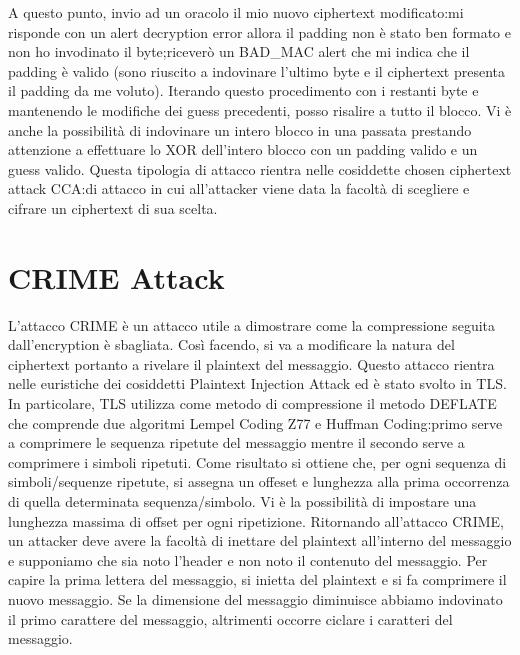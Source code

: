 \documentclass[a4paper,draft]{article}
\begin{document}
A questo punto, invio ad un oracolo il mio nuovo ciphertext modificato:\@se mi risponde con un alert decryption error allora il padding non è stato ben formato e non ho invodinato il byte;\@altrimenti riceverò un BAD\_MAC alert che mi indica che il padding è valido (sono riuscito a indovinare l'ultimo byte e il ciphertext presenta il padding da me voluto). Iterando questo procedimento con i restanti byte e mantenendo le modifiche dei guess precedenti, posso risalire a tutto il blocco\@.\newline
Vi è anche la possibilità di indovinare un intero blocco in una passata prestando attenzione a effettuare lo XOR dell'intero blocco con un padding valido e un guess valido\@.\newline
Questa tipologia di attacco rientra nelle cosiddette chosen ciphertext attack CCA:\@schemi di attacco in cui all'attacker viene data la facoltà di scegliere e cifrare un ciphertext di sua scelta\@.
\section{CRIME Attack}
L'attacco CRIME è un attacco utile a dimostrare come la compressione seguita dall'encryption è sbagliata\@. Così facendo, si va a modificare la natura del ciphertext portanto a rivelare il plaintext del messaggio\@.\newline
Questo attacco rientra nelle euristiche dei cosiddetti Plaintext Injection Attack ed è stato svolto in TLS\@. In particolare, TLS utilizza come metodo di compressione il metodo DEFLATE che comprende due algoritmi Lempel Coding Z77 e Huffman Coding:\@il primo serve a comprimere le sequenza ripetute del messaggio mentre il secondo serve a comprimere i simboli ripetuti\@.
Come risultato si ottiene che, per ogni sequenza di simboli/sequenze ripetute, si assegna un offeset e lunghezza alla prima occorrenza di quella determinata sequenza/simbolo\@. Vi è la possibilità di impostare una lunghezza massima di offset per ogni ripetizione\@.\newline
Ritornando all'attacco CRIME, un attacker deve avere la facoltà di inettare del plaintext all'interno del messaggio e supponiamo che sia noto l'header e non noto il contenuto del messaggio\@. Per capire la prima lettera del messaggio, si inietta del plaintext e si fa comprimere il nuovo messaggio\@.
Se la dimensione del messaggio diminuisce abbiamo indovinato il primo carattere del messaggio, altrimenti occorre ciclare i caratteri del messaggio\@.
\end{document}

